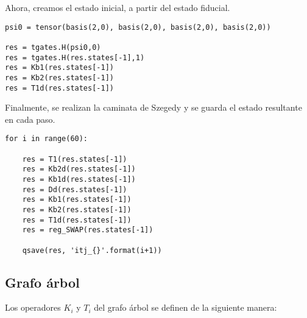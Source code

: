 Ahora, creamos el estado inicial, a partir del estado fiducial.

\begin{verbatim}
psi0 = tensor(basis(2,0), basis(2,0), basis(2,0), basis(2,0))

res = tgates.H(psi0,0)
res = tgates.H(res.states[-1],1)
res = Kb1(res.states[-1])
res = Kb2(res.states[-1])
res = T1d(res.states[-1])
\end{verbatim}

Finalmente, se realizan la caminata de Szegedy y se guarda el estado resultante en cada paso.

\begin{verbatim}
for i in range(60):
    
    res = T1(res.states[-1])
    res = Kb2d(res.states[-1])
    res = Kb1d(res.states[-1])
    res = Dd(res.states[-1])
    res = Kb1(res.states[-1])
    res = Kb2(res.states[-1])
    res = T1d(res.states[-1])
    res = reg_SWAP(res.states[-1])
    
    qsave(res, 'itj_{}'.format(i+1))

\end{verbatim}

\subsection{Grafo árbol}

Los operadores $K_i$ y $T_i$ del grafo árbol se definen de la siguiente manera:

